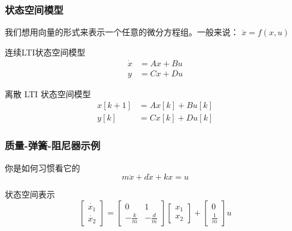 \documentclass{beamer}
\begin{document}
\begin{frame}
    \frametitle{状态空间模型}
    我们想用向量的形式来表示一个任意的微分方程组。一般来说： $\dot{x} = f(x, u)$

    \begin{block}{连续LTI状态空间模型}
        \begin{equation}
        \begin{aligned}
            \dot{x} &= A x + B u \\
            y &=C x + D u
        \end{aligned}
        \end{equation}
    \end{block}

    \begin{block}{离散 LTI 状态空间模型}
        \begin{equation}
        \begin{aligned}
            x[k+1] &= A x[k] + B u[k] \\
            y[k] &= C x[k] + D u[k]
        \end{aligned}
        \end{equation}
    \end{block}
\end{frame}


\begin{frame}
    \frametitle{质量-弹簧-阻尼器示例}

    \begin{block}{你是如何习惯看它的}
        \begin{equation}
            m \ddot{x}+d \dot{x} + kx=u
        \end{equation}
    \end{block}

    \begin{block}{状态空间表示}
        \begin{equation}
        \left[\begin{array}{c}{{\dot{x_1}}} \\ {\dot{x_2}}\end{array}\right] =\left[\begin{array}{cc}{0} & {1} \\ {-\frac{k}{m}} & {-\frac{d}{m}}\end{array}\right] \left[\begin{array}{c}{{x_1}} \\ {x_2}\end{array}\right] +\left[\begin{array}{c}{0} \\ {\frac{1}{m}}\end{array}\right] u
        \end{equation}
    \end{block}
\end{frame}
\end{document}
